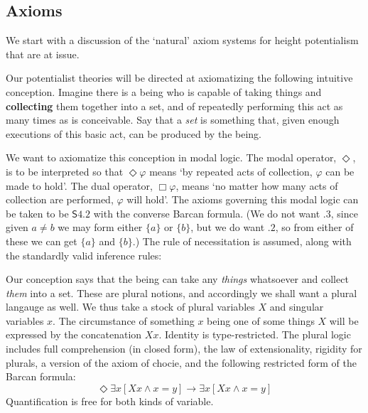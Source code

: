 \documentclass{article}
\begin{document}
\subsection{Axioms}
We start with a discussion of the `natural' axiom systems for height potentialism 
that are at issue.

Our potentialist theories will be directed at axiomatizing the following 
intuitive conception. Imagine there is a being who is capable of taking things 
and {\bf collecting} them together into a set, and of repeatedly performing this act 
as many times as is conceivable. Say that a \emph{set} is something that, given enough 
executions of this basic act, can be produced by the being. 

We want to axiomatize this conception in modal logic. The modal operator, $\Diamond$, 
is to be interpreted so that $\Diamond \varphi$ means
`by repeated acts of collection, $\varphi$ can be made to hold'. The dual 
operator, $\Box \varphi$, means `no matter how many acts of collection are performed, 
$\varphi$ will hold'. The axioms governing this modal logic can be taken to be 
$\mathsf{S4.2}$ with the converse Barcan formula. (We do not want $.3$, 
since given $a \not= b$ we may form either $\{a\}$ or $\{b\}$, but we do want 
$.2$,
so from either of these we can get $\{a\}$ and $\{b\}$.) The rule of necessitation 
is assumed, along with the standardly valid inference rules:
\begin{prooftree}
\end{prooftree}
 
Our conception says that the being can take any \emph{things} whatsoever and collect 
\emph{them} into a set. These are plural notions, and accordingly we shall want a plural 
langauge as well. We thus take a stock of plural variables $X$ and singular variables $x$.
The circumstance of something $x$ being one of some things $X$ will be expressed by 
the concatenation $Xx$. Identity is type-restricted. The plural logic includes full 
comprehension (in closed form), the law of extensionality, rigidity for plurals, a 
version of the axiom of chocie, and 
the following restricted form of the Barcan formula:
\[\Diamond \exists x[Xx \wedge x = y] \rightarrow \exists x[Xx \wedge x = y]\]
Quantification is free for both kinds of variable.
\end{document}
